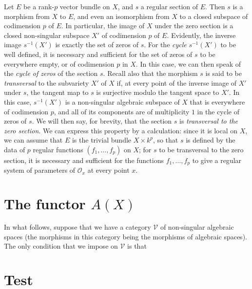 \documentclass{article}
\newcommand{\oldpage}[1]{\marginpar{\footnotesize$\Big\vert$ \textit{p.~#1}}}
\begin{document}
Let \(E\) be a rank-\(p\) vector bundle on \(X\), and \(s\) a regular section of \(E\).
Then \(s\) is a morphism from \(X\) to \(E\), and even an isomorphism from \(X\) to a closed subspace of codimension \(p\) of \(E\).
In particular, the image of \(X\) under the zero section is a closed non-singular subspace \(X'\) of codimension \(p\) of \(E\).
Evidently, the inverse image \(s^{-1}(X')\) is exactly the set of zeros of \(s\).
For the \emph{cycle} \(s^{-1}(X')\) to be well defined, it is necessary and sufficient for the set of zeros of \(s\) to be everywhere empty, or of codimension \(p\) in \(X\).
In this case, we can then speak of the \emph{cycle of zeros} of the section \(s\).
Recall also that the morphism \(s\) is said to be \emph{transversal} to the subvariety \(X'\) of \(X\) if, at every point of the inverse image of \(X'\) under \(s\), the tangent map to \(s\) is surjective modulo the tangent space to \(X'\).
In this case, \(s^{-1}(X')\) is a non-singular algebraic subspace of \(X\) that is everywhere of codimension \(p\), and all of its components are of multiplicity \(1\) in the cycle of zeros of \(s\).
We will then say, for brevity, that the section \(s\) is \emph{transversal to the zero section}.
We can express this property by a calculation:
since it is local on \(X\), we can assume that \(E\) is the trivial bundle \(X\times k^p\), so that \(s\) is defined by the data of \(p\) regular functions \((f_1,\ldots,f_p)\) on \(X\);
for \(s\) to be transversal to the zero section, it is necessary and sufficient for the functions \(f_1,\ldots,f_p\) to give a regular system of parameters of \({\mathscr{O}}_x\) at every point \(x\).

\hypertarget{section-2}{%
\section{\texorpdfstring{The functor \(A(X)\)}{The functor A(X)}}\label{section-2}}

\oldpage{140}

In what follows, suppose that we have a category \({\mathcal{V}}\) of non-singular algebraic spaces (the morphisms in this category being the morphisms of algebraic spaces).
The only condition that we impose on \({\mathcal{V}}\) is that

\hypertarget{bibliography}{%
\section*{Test}\label{bibliography}}
\end{document}
